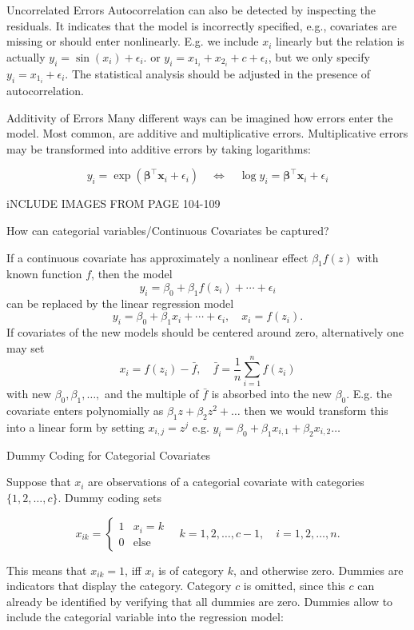 Uncorrelated Errors
Autocorrelation can also be detected by inspecting the residuals.
It indicates that the model is incorrectly specified, e.g., covariates are missing or should enter nonlinearly. 
E.g. we include \( x_i \) linearly but the relation is actually \( y_i = \sin(x_i) + \epsilon_i \).
or \( y_i = x_{1_{i}} + x_{2_{i}} + c + \epsilon_i \), but we only specify \( y_i = x_{1_{i}} + \epsilon_i \).
The statistical analysis should be adjusted in the presence of autocorrelation.

Additivity of Errors
Many different ways can be imagined how errors enter the model.
Most common, are additive and multiplicative errors. Multiplicative errors may be transformed into additive errors by taking logarithms:

\[ y_i = \exp(\boldsymbol{\beta}^\top \mathbf{x}_i + \epsilon_i) \quad \Longleftrightarrow \quad \log y_i = \boldsymbol{\beta}^\top \mathbf{x}_i + \epsilon_i \]

iNCLUDE IMAGES FROM PAGE 104-109


How can categorial variables/Continuous Covariates be captured?

If a continuous covariate has approximately a nonlinear effect \(\beta_1 f(z)\) with known function \(f\), then the model
\[ y_i = \beta_0 + \beta_1 f(z_i) + \cdots + \epsilon_i \]
can be replaced by the linear regression model
\[ y_i = \beta_0 + \beta_1 x_i + \cdots + \epsilon_i, \quad x_i = f(z_i). \]
If covariates of the new models should be centered around zero, alternatively one may set
\[ x_i = f(z_i) - \bar{f}, \quad \bar{f} = \frac{1}{n} \sum_{i=1}^n f(z_i) \]
with new \(\beta_0, \beta_1, \ldots,\) and the multiple of \(\bar{f}\) is absorbed into the new \(\beta_0\).
E.g. the covariate enters polynomially as \( \beta_1 z + \beta_2 z^2 + \dots \)
then we would transform this into a linear form by setting \( x_{i,j} = z^j \) e.g.
\( y_i = \beta_0 + \beta_1 x_{i,1} + \beta_2 x_{i,2} \dots \)


Dummy Coding for Categorial Covariates

Suppose that \( x_i \) are observations of a categorial covariate with categories \(\{1, 2, \ldots, c\}\). Dummy coding sets

\[
x_{ik} =
\begin{cases} 
1 & x_i = k \\
0 & \text{else} 
\end{cases} \quad k = 1, 2, \ldots, c - 1, \quad i = 1, 2, \ldots, n.
\]

This means that \( x_{ik} = 1 \), iff \( x_i \) is of category \( k \), and otherwise zero. Dummies are indicators that display the category. 
Category \( c \) is omitted, since this \( c \) can already be identified by verifying that all dummies are zero. 
Dummies allow to include the categorial variable into the regression model:

